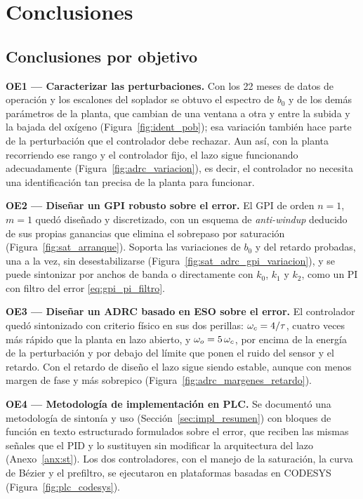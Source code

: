 \chapter{Conclusiones}
\label{cap:conclusiones}

\section{Conclusiones por objetivo}

\textbf{OE1 --- Caracterizar las perturbaciones.} Con los 22 meses de datos de operación y los
escalones del soplador se obtuvo el espectro de $b_0$ y de los demás parámetros de la planta, que
cambian de una ventana a otra y entre la subida y la bajada del oxígeno (Figura~\ref{fig:ident_pob});
esa variación también hace parte de la perturbación que el controlador debe rechazar. Aun así, con la
planta recorriendo ese rango y el controlador fijo, el lazo sigue funcionando adecuadamente
(Figura~\ref{fig:adrc_variacion}), es decir, el controlador no necesita una identificación tan precisa
de la planta para funcionar.

\textbf{OE2 --- Diseñar un GPI robusto sobre el error.} El GPI de orden $n=1$, $m=1$ quedó diseñado y
discretizado, con un esquema de \emph{anti-windup} deducido de sus propias ganancias que elimina el
sobrepaso por saturación (Figura~\ref{fig:sat_arranque}). Soporta las variaciones de $b_0$ y del retardo
probadas, una a la vez, sin desestabilizarse (Figura~\ref{fig:sat_adrc_gpi_variacion}), y se puede
sintonizar por anchos de banda o directamente con $k_0$, $k_1$ y $k_2$, como un PI con filtro del error
\eqref{eq:gpi_pi_filtro}.

\textbf{OE3 --- Diseñar un ADRC basado en ESO sobre el error.} El controlador quedó sintonizado con
criterio físico en sus dos perillas: $\omega_{c} = 4/\tau$, cuatro veces más rápido que la planta en lazo
abierto, y $\omega_{o} = 5\,\omega_{c}$, por encima de la energía de la perturbación y por debajo del límite que ponen
el ruido del sensor y el retardo. Con el retardo de diseño el lazo sigue siendo estable, aunque con
menos margen de fase y más sobrepico (Figura~\ref{fig:adrc_margenes_retardo}).

\textbf{OE4 --- Metodología de implementación en PLC.} Se documentó una metodología de sintonía y uso
(Sección~\ref{sec:impl_resumen}) con bloques de función en texto estructurado formulados sobre el error,
que reciben las mismas señales que el PID y lo sustituyen sin modificar la arquitectura del lazo
(Anexo~\ref{anx:st}). Los dos controladores, con el manejo de la saturación, la curva de Bézier y el
prefiltro, se ejecutaron en plataformas basadas en CODESYS (Figura~\ref{fig:plc_codesys}).

